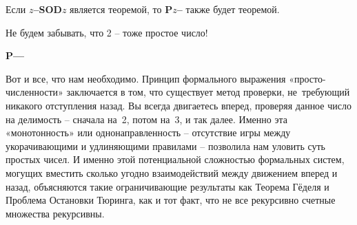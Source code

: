 \documentclass[../main.tex]{subfiles}
\begin{document}
\begin{tcolorbox}[title={ПРАВИЛО 3}]
    Если \textbf{$z$--SOD$z$} является теоремой, то \textbf{P$z$--} также будет теоремой.
\end{tcolorbox}

Не будем забывать, что 2 \--- тоже простое число!

\begin{tcolorbox}[title={АКСИОМА}]
    \textbf{P--{}--}
\end{tcolorbox}

Вот и все, что нам необходимо.
Принцип формального выражения «просто-численности» заключается в том, что существует метод проверки, не~требующий никакого отступления назад.
Вы всегда двигаетесь вперед, проверяя данное число на делимость \--- сначала на~2, потом на~3, и так далее.
Именно эта «монотонность» или однонаправленность \--- отсутствие игры между укорачивающими и удлиняющими правилами \--- позволила нам уловить суть простых чисел.
И именно этой потенциальной сложностью формальных систем, могущих вместить сколько угодно взаимодействий между движением вперед и назад, объясняются такие ограничивающие результаты как Теорема Гёделя и Проблема Остановки Тюринга, как и тот факт, что не все рекурсивно счетные множества рекурсивны.
\end{document}
